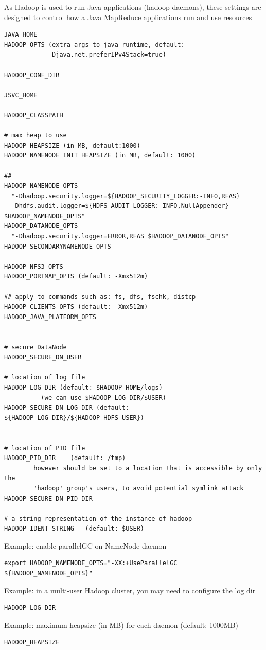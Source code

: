 As Hadoop is used to run Java applications (hadoop daemons), these settings are
designed to control how a Java MapReduce applications run and use resources
\begin{verbatim}
JAVA_HOME
HADOOP_OPTS (extra args to java-runtime, default:  
            -Djava.net.preferIPv4Stack=true)

HADOOP_CONF_DIR

JSVC_HOME

HADOOP_CLASSPATH

# max heap to use
HADOOP_HEAPSIZE (in MB, default:1000)
HADOOP_NAMENODE_INIT_HEAPSIZE (in MB, default: 1000)

## 
HADOOP_NAMENODE_OPTS
  "-Dhadoop.security.logger=${HADOOP_SECURITY_LOGGER:-INFO,RFAS}
  -Dhdfs.audit.logger=${HDFS_AUDIT_LOGGER:-INFO,NullAppender} $HADOOP_NAMENODE_OPTS"
HADOOP_DATANODE_OPTS
  "-Dhadoop.security.logger=ERROR,RFAS $HADOOP_DATANODE_OPTS"
HADOOP_SECONDARYNAMENODE_OPTS

HADOOP_NFS3_OPTS
HADOOP_PORTMAP_OPTS (default: -Xmx512m)

## apply to commands such as: fs, dfs, fschk, distcp
HADOOP_CLIENTS_OPTS (default: -Xmx512m)
HADOOP_JAVA_PLATFORM_OPTS


# secure DataNode
HADOOP_SECURE_DN_USER

# location of log file
HADOOP_LOG_DIR (default: $HADOOP_HOME/logs)
          (we can use $HADOOP_LOG_DIR/$USER)
HADOOP_SECURE_DN_LOG_DIR (default: ${HADOOP_LOG_DIR}/${HADOOP_HDFS_USER})


# location of PID file
HADOOP_PID_DIR    (default: /tmp)
        however should be set to a location that is accessible by only the 
        'hadoop' group's users, to avoid potential symlink attack
HADOOP_SECURE_DN_PID_DIR

# a string representation of the instance of hadoop
HADOOP_IDENT_STRING   (default: $USER) 

\end{verbatim}

Example: enable parallelGC  on NameNode daemon
\begin{verbatim}
export HADOOP_NAMENODE_OPTS="-XX:+UseParallelGC ${HADOOP_NAMENODE_OPTS}" 
\end{verbatim}

Example: in a multi-user Hadoop cluster, you may need to configure the log dir
\begin{verbatim}
HADOOP_LOG_DIR
\end{verbatim}

Example: maximum heapsize (in MB) for each daemon (default: 1000MB)
\begin{verbatim}
HADOOP_HEAPSIZE
\end{verbatim}


